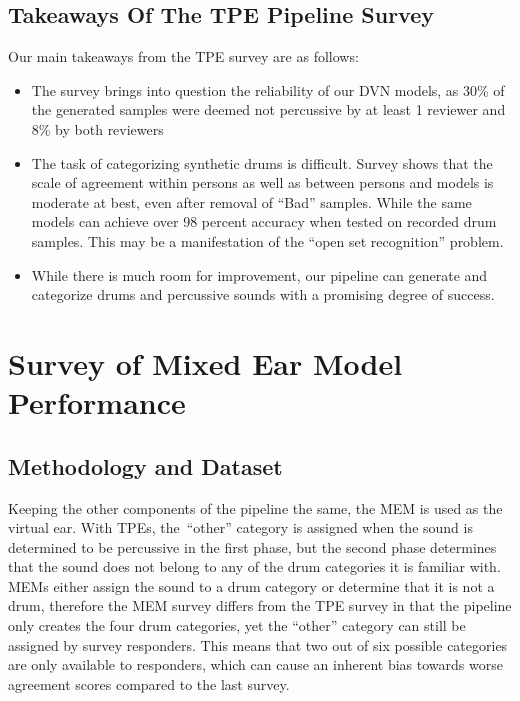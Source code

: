\documentclass[\main/thesis.tex]{subfiles}
\begin{document}
\subsection{Takeaways Of The TPE Pipeline Survey}
Our main takeaways from the TPE survey are as follows:
\label{survey1_takeaway}
\begin{itemize}
    \item The survey brings into question the reliability of our DVN models, as 30\% of the generated samples were deemed not percussive by at least 1 reviewer and 8\% by both reviewers
    \item The task of categorizing synthetic drums is difficult. Survey shows that the scale of agreement within persons as well as between persons and models is moderate at best, even after removal of \enquote{Bad} samples.  While the same models can achieve over 98 percent accuracy when tested on recorded drum samples. This may be a manifestation of the \enquote{open set recognition} problem. 
    \item While there is much room for improvement, our pipeline can generate and categorize drums and percussive sounds with a promising degree of success. 
\end{itemize}

 \section{Survey of Mixed Ear Model Performance}
  \subsection{Methodology and Dataset}
 Keeping the other components of the pipeline the same, the MEM is used as the virtual ear. With TPEs, the~\enquote{other} category is assigned when the sound is determined to be percussive in the first phase, but the second phase determines that the sound does not belong to any of the drum categories it is familiar with. MEMs either assign the sound to a drum category or determine that it is not a drum, therefore the MEM survey differs from the TPE survey in that the pipeline only creates the four drum categories, yet the \enquote{other} category can still be assigned by survey responders. This means that two out of six possible categories are only available to responders, which can cause an inherent bias towards worse agreement scores compared to the last survey. 
\end{document}
